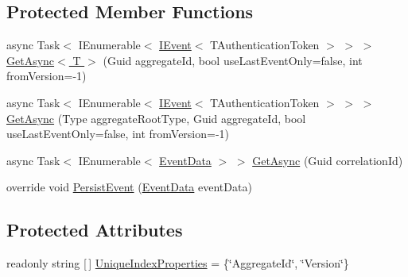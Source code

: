 \subsection*{Protected Member Functions}
\begin{DoxyCompactItemize}
\item 
async Task$<$ I\+Enumerable$<$ \hyperlink{interfaceCqrs_1_1Events_1_1IEvent}{I\+Event}$<$ T\+Authentication\+Token $>$ $>$ $>$ \hyperlink{classCqrs_1_1Azure_1_1DocumentDb_1_1Events_1_1AzureDocumentDbEventStore_a2845015d6fda0d9e79b77b82d9452a4d}{Get\+Async$<$ T $>$} (Guid aggregate\+Id, bool use\+Last\+Event\+Only=false, int from\+Version=-\/1)
\item 
async Task$<$ I\+Enumerable$<$ \hyperlink{interfaceCqrs_1_1Events_1_1IEvent}{I\+Event}$<$ T\+Authentication\+Token $>$ $>$ $>$ \hyperlink{classCqrs_1_1Azure_1_1DocumentDb_1_1Events_1_1AzureDocumentDbEventStore_a8b481bf0b0f6b50184441965630f5443}{Get\+Async} (Type aggregate\+Root\+Type, Guid aggregate\+Id, bool use\+Last\+Event\+Only=false, int from\+Version=-\/1)
\item 
async Task$<$ I\+Enumerable$<$ \hyperlink{classCqrs_1_1Events_1_1EventData}{Event\+Data} $>$ $>$ \hyperlink{classCqrs_1_1Azure_1_1DocumentDb_1_1Events_1_1AzureDocumentDbEventStore_ae44ea4b68f4794022b685bc380abbd04}{Get\+Async} (Guid correlation\+Id)
\item 
override void \hyperlink{classCqrs_1_1Azure_1_1DocumentDb_1_1Events_1_1AzureDocumentDbEventStore_afe494469614082cf667f5cf4b6c4a97b}{Persist\+Event} (\hyperlink{classCqrs_1_1Events_1_1EventData}{Event\+Data} event\+Data)
\end{DoxyCompactItemize}
\subsection*{Protected Attributes}
\begin{DoxyCompactItemize}
\item 
readonly string \mbox{[}$\,$\mbox{]} \hyperlink{classCqrs_1_1Azure_1_1DocumentDb_1_1Events_1_1AzureDocumentDbEventStore_ab2a2b5dd046487edc33917983587d847}{Unique\+Index\+Properties} = \{\char`\"{}Aggregate\+Id\char`\"{}, \char`\"{}Version\char`\"{}\}
\end{DoxyCompactItemize}
